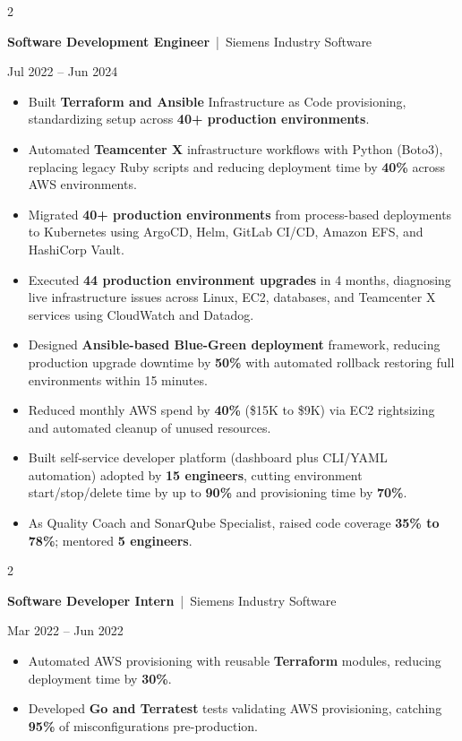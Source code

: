 \documentclass[10pt, letterpaper]{article}
\newenvironment{highlights}{
    \begin{itemize}[
        topsep=0.10 cm,
        parsep=0.06 cm,
        partopsep=0pt,
        itemsep=0.06 cm,
        leftmargin=12pt
    ]
}{
    \end{itemize}
}
\newenvironment{twocolentry}[2][]{
    \onecolentry
    \def\secondColumn{#2}
    \setcolumnwidth{\fill, 4.5 cm}
    \begin{paracol}{2}
}{
    \switchcolumn \raggedleft \secondColumn
    \end{paracol}
    \endonecolentry
}
\begin{document}
\vspace{0.15 cm}

\begin{twocolentry}{Jul 2022 -- Jun 2024}
\textbf{Software Development Engineer} \,|\, Siemens Industry Software
\end{twocolentry}
\begin{highlights}
  \item Built \textbf{Terraform and Ansible} Infrastructure as Code provisioning, standardizing setup across \textbf{40+ production environments}.
  \item Automated \textbf{Teamcenter X} infrastructure workflows with Python (Boto3), replacing legacy Ruby scripts and reducing deployment time by \textbf{40\%} across AWS environments.
  \item Migrated \textbf{40+ production environments} from process-based deployments to Kubernetes using ArgoCD, Helm, GitLab CI/CD, Amazon EFS, and HashiCorp Vault.
  \item Executed \textbf{44 production environment upgrades} in 4 months, diagnosing live infrastructure issues across Linux, EC2, databases, and Teamcenter X services using CloudWatch and Datadog.
  \item Designed \textbf{Ansible-based Blue-Green deployment} framework, reducing production upgrade downtime by \textbf{50\%} with automated rollback restoring full environments within 15 minutes.
  \item Reduced monthly AWS spend by \textbf{40\%} (\$15K to \$9K) via EC2 rightsizing and automated cleanup of unused resources.
  \item Built self-service developer platform (dashboard plus CLI/YAML automation) adopted by \textbf{15 engineers}, cutting environment start/stop/delete time by up to \textbf{90\%} and provisioning time by \textbf{70\%}.
  \item As Quality Coach and SonarQube Specialist, raised code coverage \textbf{35\% to 78\%}; mentored \textbf{5 engineers}.
\end{highlights}

\vspace{0.15 cm}

\begin{twocolentry}{Mar 2022 -- Jun 2022}
\textbf{Software Developer Intern} \,|\, Siemens Industry Software
\end{twocolentry}
\begin{highlights}
  \item Automated AWS provisioning with reusable \textbf{Terraform} modules, reducing deployment time by \textbf{30\%}.
  \item Developed \textbf{Go and Terratest} tests validating AWS provisioning, catching \textbf{95\%} of misconfigurations pre-production.
\end{highlights}
\end{document}
